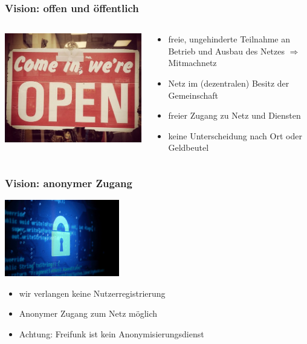 \documentclass[10pt,handout]{beamer}
\begin{document}
\begin{frame}
	\frametitle{Vision: offen und öffentlich}
	\begin{columns}[c]
		\begin{column}{5cm}
			\includegraphics[width=\textwidth]{images/open}
		\end{column}
		\begin{column}{7cm}
			\begin{itemize}[<+->]
				\item freie, ungehinderte Teilnahme an Betrieb und Ausbau des Netzes $\Rightarrow$ Mitmachnetz
				\item Netz im (dezentralen) Besitz der Gemeinschaft
				\item freier Zugang zu Netz und Diensten
				\item keine Unterscheidung nach Ort oder Geldbeutel
			\end{itemize}
		\end{column}
	\end{columns}	
\end{frame}

\begin{frame}
	\frametitle{Vision: anonymer Zugang}
	\begin{center}
		\includegraphics[width=5cm]{images/lock}
	\end{center}
	\begin{itemize}[<+->]
		\item wir verlangen keine Nutzerregistrierung
		\item Anonymer Zugang zum Netz möglich
		\item Achtung: Freifunk ist kein Anonymisierungsdienst
	\end{itemize}

\end{frame}
\end{document}
